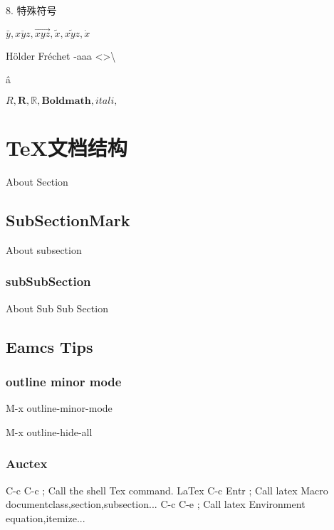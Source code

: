 \documentclass[UTF8]{ctexart}
\begin{document}
8. 特殊符号

$\bar{y},\overline{xyz},\vec{xyz}, \tilde{x},\widetilde{xyz}, \dot{x}$

H\"{o}lder Fr\'echet \textbar \--{aaa} \textless \textgreater \textbackslash \par\^{a}


$R,\mathbf{R}, \mathbb{R}, \textbf{Boldmath}, \textit{itali},$

\section{TeX文档结构}
About Section
\subsection{SubSectionMark}
About subsection
\subsubsection{subSubSection}
About Sub Sub Section
\subsection{Eamcs Tips}
\subsubsection{outline minor mode}
M-x outline-minor-mode

M-x outline-hide-all
\subsubsection{Auctex}
C-c C-c  ; Call the shell Tex command. LaTex
C-c Entr ; Call latex Macro documentclass,section,subsection...
C-c C-e  ; Call latex Environment equation,itemize...
\end{document}
